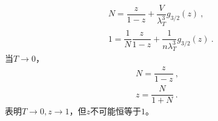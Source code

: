 \documentclass[12pt,a4paper]{article}
\begin{document}
\begin{align}
& N = \dfrac{z}{1-z} + \dfrac{V}{\lambda^{3}_T} g_{3/2}(z) ~, \\
& 1 = \dfrac{1}{N} \dfrac{z}{1-z} + \dfrac{1}{ n \lambda^{3}_T} g_{3/2}(z) ~.
\end{align}
当$T \rightarrow 0$，
\begin{align}
N = \dfrac{z}{1-z} ~, \\
z  = \dfrac{N}{1+N} ~.
\end{align}
表明$T \rightarrow 0, z \rightarrow 1$，但$z$不可能恒等于$1$。

























































\end{document}
